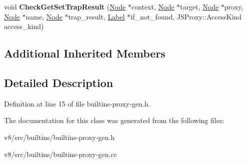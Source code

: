 \begin{DoxyCompactItemize}
\item 
\mbox{\label{classv8_1_1internal_1_1ProxiesCodeStubAssembler_aaadc9317271a2d7a0af86379f1c518fd}} 
void {\bfseries Check\+Get\+Set\+Trap\+Result} (\mbox{\hyperlink{classv8_1_1internal_1_1compiler_1_1Node}{Node}} $\ast$context, \mbox{\hyperlink{classv8_1_1internal_1_1compiler_1_1Node}{Node}} $\ast$target, \mbox{\hyperlink{classv8_1_1internal_1_1compiler_1_1Node}{Node}} $\ast$proxy, \mbox{\hyperlink{classv8_1_1internal_1_1compiler_1_1Node}{Node}} $\ast$name, \mbox{\hyperlink{classv8_1_1internal_1_1compiler_1_1Node}{Node}} $\ast$trap\+\_\+result, \mbox{\hyperlink{classv8_1_1internal_1_1compiler_1_1CodeAssemblerLabel}{Label}} $\ast$if\+\_\+not\+\_\+found, J\+S\+Proxy\+::\+Access\+Kind access\+\_\+kind)
\end{DoxyCompactItemize}
\subsection*{Additional Inherited Members}


\subsection{Detailed Description}


Definition at line 15 of file builtins-\/proxy-\/gen.\+h.



The documentation for this class was generated from the following files\+:\begin{DoxyCompactItemize}
\item 
v8/src/builtins/builtins-\/proxy-\/gen.\+h\item 
v8/src/builtins/builtins-\/proxy-\/gen.\+cc\end{DoxyCompactItemize}
